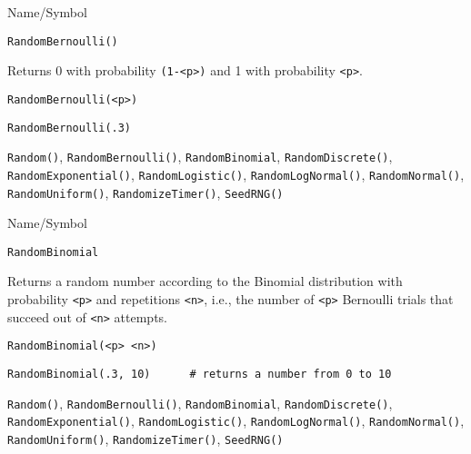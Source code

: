 \begin{desc}{Name/Symbol}
\item[Name/Symbol]	\verb+RandomBernoulli()+

\item[Description]	Returns 0 with probability \verb+(1-<p>)+ and 1 with probability \verb+<p>+.

\item[Usage]		
\begin{verbatim}
RandomBernoulli(<p>)
\end{verbatim}

\item[Example]	
\begin{verbatim}
RandomBernoulli(.3)
\end{verbatim}

\item[See Also] \verb+Random()+, \verb+RandomBernoulli()+,
  \verb+RandomBinomial+, \verb+RandomDiscrete()+,
  \verb+RandomExponential()+, \verb+RandomLogistic()+,
  \verb+RandomLogNormal()+, \verb+RandomNormal()+,
  \verb+RandomUniform()+, \verb+RandomizeTimer()+, \verb+SeedRNG()+
\end{desc}

\begin{desc}{Name/Symbol}
\item[Name/Symbol]	\verb+RandomBinomial+

\item[Description] Returns a random number according to the Binomial
  distribution with probability \verb+<p>+ and repetitions \verb+<n>+,
  i.e., the number of \verb+<p>+ Bernoulli trials that succeed out of
  \verb+<n>+ attempts.

\item[Usage]		
\begin{verbatim}
RandomBinomial(<p> <n>)  
\end{verbatim}

\item[Example]	
\begin{verbatim}
RandomBinomial(.3, 10)		# returns a number from 0 to 10
\end{verbatim}

\item[See Also]	\verb+Random()+, \verb+RandomBernoulli()+, \verb+RandomBinomial+,
		\verb+RandomDiscrete()+, \verb+RandomExponential()+, \verb+RandomLogistic()+,
		\verb+RandomLogNormal()+, \verb+RandomNormal()+, \verb+RandomUniform()+,    
		\verb+RandomizeTimer()+, \verb+SeedRNG()+    
\end{desc}

